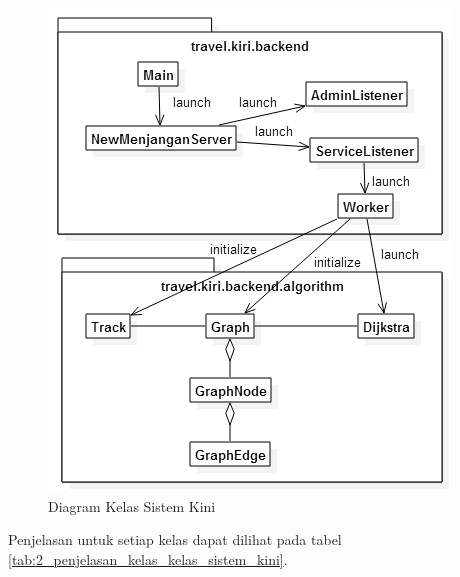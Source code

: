\begin{figure}
\centering
\includegraphics[scale=0.5]{Gambar/2_diagram_kelas_sistem_kini}
\caption{Diagram Kelas Sistem Kini} 
\label{fig:2_diagram_kelas_sistem_kini}
\end{figure}

Penjelasan untuk setiap kelas dapat dilihat pada tabel
\ref{tab:2_penjelasan_kelas_kelas_sistem_kini}.

